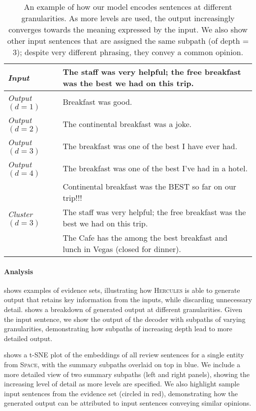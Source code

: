 \documentclass[11pt]{article}
\begin{document}
\begin{table}[t]
\centering
    \small
    \begin{tabular}{@{}m{2cm}@{~}|@{~}m{5.3cm}@{}}
\hline\hline
    \textit{Input} & The staff was very helpful; the free breakfast was the best we had on this trip. \\
    \hline
\textit{Output $(d=1)$} & Breakfast was good. \\
    \textit{Output $(d=2)$} & The continental breakfast was a joke. \\    
    \textit{Output $(d=3)$} & The breakfast was one of the best I have ever had. \\
    \textit{Output $(d=4)$} & The breakfast was one of the best I've had in a hotel. \\
\hline
    \multirow{7}{*}{\textit{Cluster $(d=3)$}} &
    Continental breakfast was the BEST so far on our trip!!! \\
& The staff was very helpful; the free breakfast was the best we had on this trip. \\
& The Cafe has the among the best breakfast and lunch in Vegas (closed for dinner). \\
\hline\hline
        \end{tabular}
        \vspace{-.1cm}
    \caption{An example of how our model encodes sentences at different granularities. As more levels are used, the output increasingly converges towards the meaning expressed by the input. We also show other input sentences that are assigned the same subpath (of depth = 3); despite very different phrasing, they convey a common opinion.}
    \vspace{-.2cm}
    \label{tab:analysis}
\end{table}

\paragraph{Analysis}

 shows examples of evidence sets, illustrating how \textsc{Hercules} is able to generate output that retains key information from the inputs, while discarding unnecessary detail.  shows a breakdown of generated output at different granularities. Given the input sentence, we show the output of the decoder with subpaths of varying granularities, demonstrating how subpaths of increasing depth lead to more detailed output.

 shows a t-SNE \cite{tsne} plot of the embeddings of all review sentences for a single entity from \textsc{Space}, with the summary subpaths overlaid on top in blue. We include a more detailed view of two summary subpaths (left and right panels), showing the increasing level of detail as more levels are specified. We also highlight sample input sentences from the evidence set (circled in red), demonstrating how the generated output can be attributed to input sentences conveying similar opinions.
\end{document}
